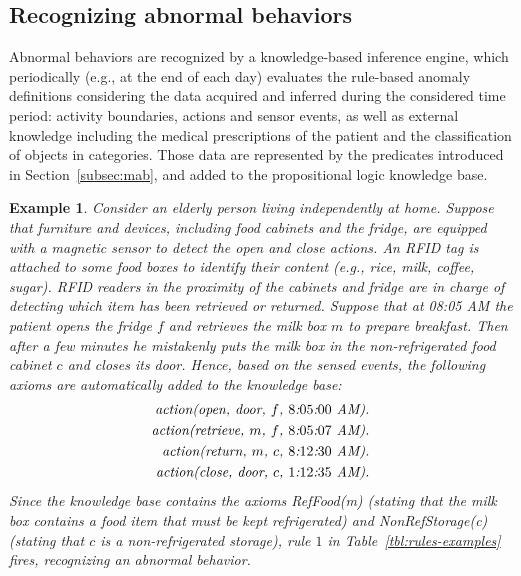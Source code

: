 \documentclass[10pt, conference, compsocconf]{IEEEtran}
\newtheorem{example}{Example}
\begin{document}
\subsection{Recognizing abnormal behaviors}
Abnormal behaviors are recognized by a knowledge-based inference engine,
which periodically (e.g., at the end of each day) evaluates the rule-based 
anomaly definitions considering 
the data acquired and inferred during the considered time period:
activity boundaries, actions and sensor events, as well as external 
knowledge including the medical prescriptions of the patient and the classification
of objects in categories. 
Those data are represented by the predicates introduced in 
Section~\ref{subsec:mab}, and added to the propositional 
logic knowledge base. 


\begin{example}
Consider an elderly person living independently at home. 
Suppose that furniture and devices, including food cabinets and the fridge, 
are equipped with a magnetic sensor to detect the \emph{open}
and \emph{close} actions.
An RFID tag is attached to some food boxes to identify their content (e.g., 
rice, milk, coffee, sugar). RFID readers in the proximity of the cabinets
and fridge are in charge of 
detecting which item has been retrieved or returned. 
Suppose that at 08:05 AM the patient opens the fridge $f$ and retrieves the milk
box $m$ to prepare breakfast. Then after a few minutes he mistakenly puts the milk box 
in the non-refrigerated food cabinet $c$ and closes its door. 
Hence, based on the sensed events, the following axioms are 
automatically added to the knowledge base:
\begin{eqnarray}\nonumber
\textrm{\emph{action(open, door, $f$, $8$:$05$:$00$ AM).}}\\\nonumber
\textrm{\emph{action(retrieve, $m$, $f$, $8$:$05$:$07$ AM).}}\\\nonumber
\textrm{\emph{action(return, $m$, $c$, $8$:$12$:$30$ AM).}}\\\nonumber
\textrm{\emph{action(close, door, $c$, $1$:$12$:$35$ AM).}}\nonumber
\end{eqnarray}
Since the knowledge base contains the axioms \emph{RefFood(m)} (stating that
the milk box contains a food item that must be kept refrigerated) 
and \emph{NonRefStorage(c)} (stating that $c$ is a non-refrigerated storage), 
rule $1$ in Table~\ref{tbl:rules-examples} fires,
recognizing an abnormal behavior.
\end{example}
 
 
\end{document}
